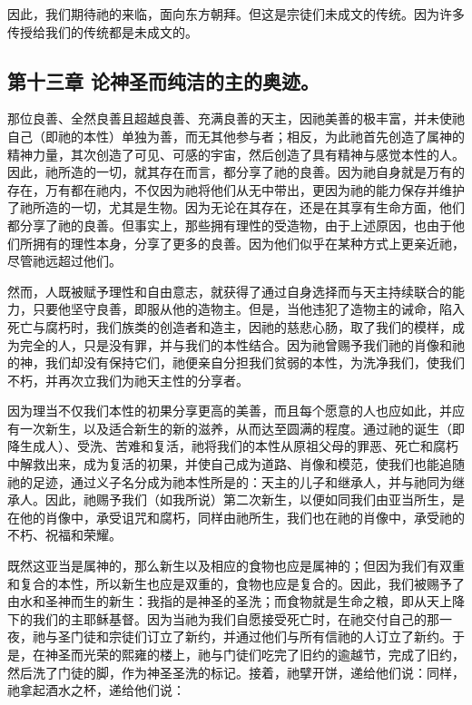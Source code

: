 因此，我们期待祂的来临，面向东方朝拜。但这是宗徒们未成文的传统。因为许多传授给我们的传统都是未成文的。\par


\subsection{第十三章 论神圣而纯洁的主的奥迹。}

那位良善、全然良善且超越良善、充满良善的天主，因祂美善的极丰富，并未使祂自己（即祂的本性）单独为善，而无其他参与者；相反，为此祂首先创造了属神的精神力量，其次创造了可见、可感的宇宙，然后创造了具有精神与感觉本性的人。因此，祂所造的一切，就其存在而言，都分享了祂的良善。因为祂自身就是万有的存在，万有都在祂内，不仅因为祂将他们从无中带出，更因为祂的能力保存并维护了祂所造的一切，尤其是生物。因为无论在其存在，还是在其享有生命方面，他们都分享了祂的良善。但事实上，那些拥有理性的受造物，由于上述原因，也由于他们所拥有的理性本身，分享了更多的良善。因为他们似乎在某种方式上更亲近祂，尽管祂远超过他们。\par

然而，人既被赋予理性和自由意志，就获得了通过自身选择而与天主持续联合的能力，只要他坚守良善，即服从他的造物主。但是，当他违犯了造物主的诫命，陷入死亡与腐朽时，我们族类的创造者和造主，因祂的慈悲心肠，取了我们的模样，成为完全的人，只是没有罪，并与我们的本性结合。因为祂曾赐予我们祂的肖像和祂的神，我们却没有保持它们，祂便亲自分担我们贫弱的本性，为洗净我们，使我们不朽，并再次立我们为祂天主性的分享者。\par

因为理当不仅我们本性的初果分享更高的美善，而且每个愿意的人也应如此，并应有一次新生，以及适合新生的新的滋养，从而达至圆满的程度。通过祂的诞生（即降生成人）、受洗、苦难和复活，祂将我们的本性从原祖父母的罪恶、死亡和腐朽中解救出来，成为复活的初果，并使自己成为道路、肖像和模范，使我们也能追随祂的足迹，通过义子名分成为祂本性所是的：天主的儿子和继承人，并与祂同为继承人。因此，祂赐予我们（如我所说）第二次新生，以便如同我们由亚当所生，是在他的肖像中，承受诅咒和腐朽，同样由祂所生，我们也在祂的肖像中，承受祂的不朽、祝福和荣耀。\par

既然这亚当是属神的，那么新生以及相应的食物也应是属神的；但因为我们有双重和复合的本性，所以新生也应是双重的，食物也应是复合的。因此，我们被赐予了由水和圣神而生的新生：我指的是神圣的圣洗；而食物就是生命之粮，即从天上降下的我们的主耶稣基督。因为当祂为我们自愿接受死亡时，在祂交付自己的那一夜，祂与圣门徒和宗徒们订立了新约，并通过他们与所有信祂的人订立了新约。于是，在神圣而光荣的熙雍的楼上，祂与门徒们吃完了旧约的逾越节，完成了旧约，然后洗了门徒的脚，作为神圣圣洗的标记。接着，祂擘开饼，递给他们说：同样，祂拿起酒水之杯，递给他们说：\par

